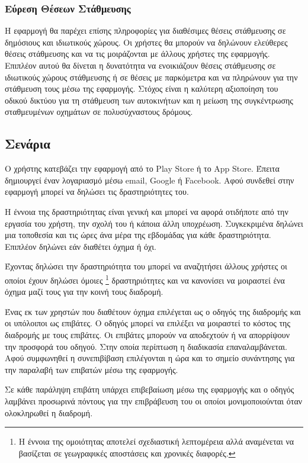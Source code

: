 \documentclass[11pt]{article}
\begin{document}
\subsubsection{Εύρεση Θέσεων Στάθμευσης}

Η εφαρμογή θα παρέχει επίσης πληροφορίες για διαθέσιμες θέσεις
στάθμευσης σε δημόσιους και ιδιωτικούς χώρους. Οι χρήστες θα
μπορούν να δηλώνουν ελεύθερες θέσεις στάθμευσης και να τις μοιράζονται με
άλλους χρήστες της εφαρμογής. Επιπλέον αυτού θα δίνεται η δυνατότητα να
ενοικιάζουν θέσεις στάθμευσης σε ιδιωτικούς χώρους στάθμευσης ή σε θέσεις
με παρκόμετρα και να πληρώνουν για την στάθμευση τους μέσω της εφαρμογής.
Στόχος είναι η καλύτερη αξιοποίηση του οδικού δικτύου για τη στάθμευση
των αυτοκινήτων και η μείωση της συγκέντρωσης σταθμευμένων οχημάτων σε
πολυσύχναστους δρόμους.

\subsection{Σενάρια}

Ο χρήστης κατεβάζει την εφαρμογή από το Play Store ή το App Store.
Έπειτα δημιουργεί έναν λογαριασμό μέσω email, Google ή Facebook.
Αφού συνδεθεί στην εφαρμογή μπορεί να δηλώσει τις δραστηριότητες του.

Η έννοια της δραστηριότητας είναι γενική και μπορεί να αφορά οτιδήποτε
από την εργασία του χρήστη, την σχολή του ή κάποια άλλη υποχρέωση.
Συγκεκριμένα δηλώνει μια τοποθεσία και τις ώρες άνα μέρα της εβδομάδας
για κάθε δραστηριότητα. Επιπλέον δηλώνει εάν διαθέτει όχημα ή όχι.

Έχοντας δηλώσει την δραστηριότητα του μπορεί να αναζητήσει άλλους χρήστες
οι οποίοι έχουν δηλώσει όμοιες
\footnote{
    Η έννοια της ομοιότητας αποτελεί σχεδιαστική λεπτομέρεια αλλά
    αναμένεται να βασίζεται σε γεωγραφικές αποστάσεις και χρονικές διαφορές.
}
δραστηριότητες και να κανονίσει να μοιραστεί ένα όχημα μαζί τους για
την κοινή τους διαδρομή.

Ένας εκ των χρηστών που διαθέτουν όχημα επιλέγεται
ως ο οδηγός της διαδρομής και οι υπόλοιποι ως επιβάτες. Ο οδηγός μπορεί να
επιλέξει να μοιραστεί το κόστος της διαδρομής με τους επιβάτες. Οι
επιβάτες μπορούν να αποδεχτούν ή να απορρίψουν την προσφορά του οδηγού.
Στην οποία περίπτωση η διαδικασία επαναλαμβάνεται.
Αφού συμφωνηθεί η συνεπιβίβαση επιλέγονται η ώρα και το σημείο συνάντησης
για την παραλαβή των επιβατών μέσω της εφαρμογής.

Σε κάθε παράληψη επιβάτη υπάρχει επιβεβαίωση μέσω της εφαρμογής και ο
οδηγός λαμβάνει προσωρινά πόντους για την επιβράβευση του οι οποίοι
μονιμοποιούνται όταν ολοκληρωθεί η διαδρομή.
\end{document}
